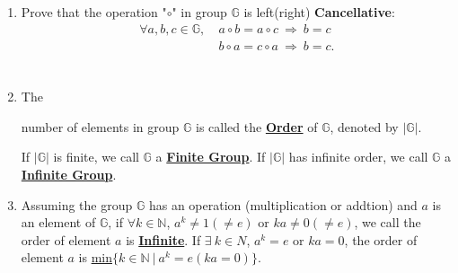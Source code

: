 \documentclass[12pt]{scrartcl}
\begin{document}
{{\begin{enumerate}[label=(\alph*)]
	\item Prove that the operation "$\circ$" in group $\mathbb{G}$ is left(right) \textbf{Cancellative}: 
	\begin{align*}
	\forall a, b, c \in \mathbb{G}, ~ &a \circ b = a \circ c ~ \Longrightarrow ~ b = c \\
	&b \circ a = c \circ a ~ \Longrightarrow ~ b = c.\\
	\end{align*}
	\\


	\item The \rule{0pt}{20pt}number of elements in group $\mathbb{G}$ is called the \underline{\textbf{Order}} of $\mathbb{G}$, denoted by $|\mathbb{G}|$. 

	\begin{spacing}{1.2}If $|\mathbb{G}|$ is finite, we call $\mathbb{G}$ a \underline{\textbf{Finite Group}}.  If $|\mathbb{G}|$ has infinite order, we call $\mathbb{G}$ a \underline{\textbf{Infinite Group}}.\end{spacing}


	\item \begin{spacing}{1.2}Assuming the group $\mathbb{G}$ has an operation (multiplication or addtion) and $a$ is an element of $\mathbb{G}$, if $\forall k \in \mathbb{N}$, $a^{k} \neq 1 (\neq e)$ or $ka \neq 0 (\neq e)$, we call the order of element $a$ is \underline{\textbf{Infinite}\vphantom{y}}. If $\exists ~ k \in N$, $a^{k} = e$ or $ka = 0$, the order of element $a$ is \underline{min$\{k \in \mathbb{N} ~ | ~ a^{k} = e (ka = 0)\}$}. \end{spacing}



\end{enumerate}}}
\end{document}

